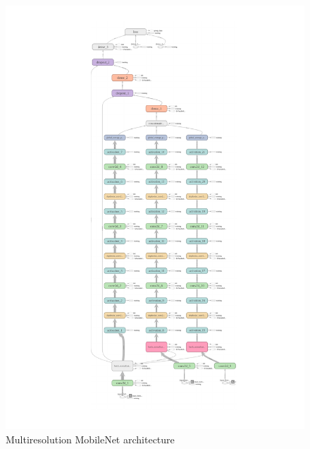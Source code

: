 \documentclass{article}
\begin{document}
\begin{figure}[h]
  \vspace*{-42mm}
  \includegraphics[scale=0.8]{mobilemodelhires.pdf}
  \vspace*{-19mm}
  \caption{Multiresolution MobileNet architecture}
  \label{fig:mobilenetgraph}
\end{figure}
\end{document}
